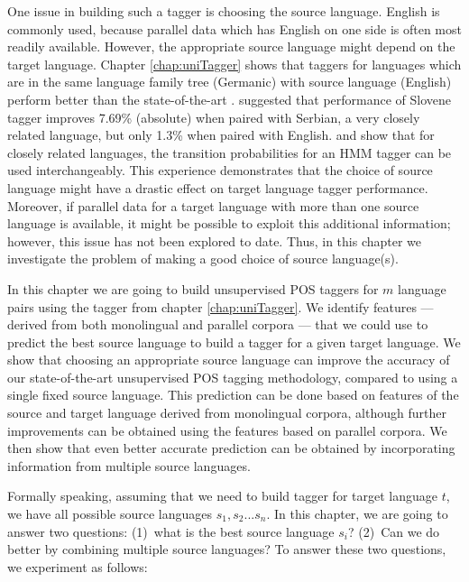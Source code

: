 One issue in building such a tagger is choosing the source
language. English is commonly used, because parallel data which has
English on one side is often most readily available. However, the
appropriate source language might depend on the target language. 
Chapter \ref{chap:uniTagger} shows that taggers for languages which are in the same language family tree (Germanic) with source language (English) perform better than the state-of-the-art \cite{Das:2011}.  suggested that performance of Slovene tagger improves 7.69\% (absolute) when paired with Serbian, a very closely related language, but only 1.3\% when paired with English.  and  show that for closely related languages, the transition probabilities for an HMM tagger can be
used interchangeably.  This experience demonstrates that the choice of
source language might have a drastic effect on target language tagger performance. Moreover, if parallel data for a target language with more than one source language is available, it might be possible to exploit this additional information; however, this issue has not been explored to date. Thus, in this chapter we investigate the problem of making a good choice of source language(s).


In this chapter we are going to build unsupervised POS taggers for $m$ language
pairs using the tagger from chapter \ref{chap:uniTagger}. We identify features --- derived from both monolingual and parallel corpora --- that we could use to predict the best source language to build a tagger for a given target language. We show that choosing an appropriate source language can improve the accuracy of our
state-of-the-art unsupervised POS tagging methodology, compared to
using a single fixed source language. This prediction can be done
based on features of the source and target language derived from
monolingual corpora, although further improvements can be obtained
using the features based on parallel corpora. We then show that even
better accurate prediction can be obtained by incorporating information from
multiple source languages. 

Formally speaking, assuming that we need to build tagger for target language $t$, we have all possible source languages  $s_1,s_2...s_n$. In this chapter, we are going to answer two questions: (1)~what is the best source language $s_i$? (2)~Can we do better by combining multiple source languages? To answer these two questions, we experiment as follows:

